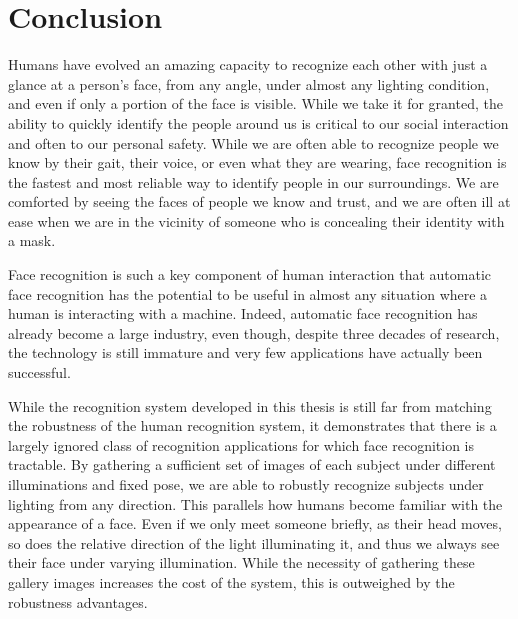 \chapter{Conclusion}
\label{chap:conclusion}

Humans have evolved an amazing capacity to recognize each other with just a
glance at a person's face, from any angle, under almost any lighting condition,
and even if only a portion of the face is visible.  While we take it for
granted, the ability to quickly identify the people around us is critical to
our social interaction and often to our personal safety.  While we are often
able to recognize people we know by their gait, their voice, or even what they
are wearing, face recognition is the fastest and
most reliable way to identify people in our surroundings.  We are comforted by
seeing the faces of people we know and trust, and we are often ill at ease when
we are in the vicinity of someone who is concealing their identity with a mask.  

Face recognition is such a key component of human interaction that automatic
face recognition has the potential to be useful in almost any situation where a
human is interacting with a machine.  Indeed, automatic face recognition has
already become a large industry, even though, despite three decades of
research, the technology is still immature and very few applications have
actually been successful.

While the recognition system developed in this thesis is still far from
matching the robustness of the human recognition system, it demonstrates that
there is a largely ignored class of recognition applications for which face
recognition is tractable.  By gathering a sufficient set of images of each
subject under different illuminations and fixed pose, we are able to robustly
recognize subjects under lighting from any direction.  This parallels how
humans become familiar with the appearance of a face. Even if we only meet
someone briefly, as their head moves, so does the relative direction of the
light illuminating it, and thus we always see their face under varying
illumination.  While the necessity of gathering these gallery images increases
the cost of the system, this is outweighed by the robustness advantages.

